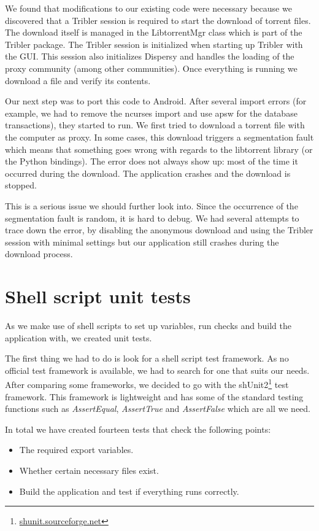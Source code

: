 	We found that modifications to our existing code were necessary because we discovered that a Tribler session is required to start the download of torrent files. The download itself is managed in the LibtorrentMgr class which is part of the Tribler package. The Tribler session is initialized when starting up Tribler with the GUI. This session also initializes Dispersy and handles the loading of the proxy community (among other communities). Once everything is running we download a file and verify its contents.
	
	Our next step was to port this code to Android. After several import errors (for example, we had to remove the ncurses import and use apsw for the database transactions), they started to run. We first tried to download a torrent file with the computer as proxy. In some cases, this download triggers a segmentation fault which means that something goes wrong with regards to the libtorrent library (or the Python bindings). The error does not always show up: most of the time it occurred during the download. The application crashes and the download is stopped.
	
	This is a serious issue we should further look into. Since the occurrence of the segmentation fault is random, it is hard to debug. We had several attempts to trace down the error, by disabling the anonymous download and using the Tribler session with minimal settings but our application still crashes during the download process.

	\section{Shell script unit tests}
		As we make use of shell scripts to set up variables, run checks and build the application with, we created unit tests.
		
		The first thing we had to do is look for a shell script test framework. As no official test framework is available, we had to search for one that suits our needs. After comparing some frameworks, we decided to go with the shUnit2\footnote{\href{http://shunit.sourceforge.net}{shunit.sourceforge.net}} test framework. This framework is lightweight and has some of the standard testing functions such as \emph{AssertEqual}, \emph{AssertTrue} and \emph{AssertFalse} which are all we need. 
		
		In total we have created fourteen tests that check the following points:
		
		\begin{itemize}
			\item The required export variables.
			\item Whether certain necessary files exist.
			\item Build the application and test if everything runs correctly.
		\end{itemize}
		
